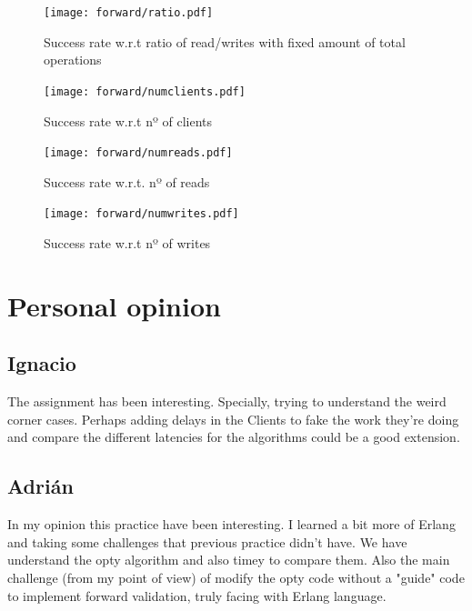 \documentclass[a4paper, 10pt]{article}
\begin{document}
\begin{figure}[H]
  \centering
  \texttt{[image: forward/ratio.pdf]}
    \caption{Success rate w.r.t ratio of read/writes with fixed amount of total operations}
    \label{}
\end{figure} 

\begin{figure}[H]
  \centering
  \texttt{[image: forward/numclients.pdf]}
    \caption{Success rate w.r.t nº of clients}
    \label{}
\end{figure} 

\begin{figure}[H]
  \centering
  \texttt{[image: forward/numreads.pdf]}
    \caption{Success rate w.r.t. nº of reads}
    \label{}
\end{figure} 

\begin{figure}[H]
  \centering
  \texttt{[image: forward/numwrites.pdf]}
    \caption{Success rate w.r.t nº of writes}
    \label{}
\end{figure} 



\clearpage
\section{Personal opinion}

\subsection{Ignacio}

The assignment has been interesting. Specially, trying to understand the weird corner cases. Perhaps adding delays in the Clients to fake the work they're doing and compare the different latencies for the algorithms could be a good extension.

\subsection{Adrián}

In my opinion this practice have been interesting. I learned a bit more of Erlang and taking some challenges that previous practice didn't have. We have understand the opty algorithm and also timey to compare them. Also the main challenge (from my point of view) of modify the opty code without a "guide" code to implement forward validation, truly facing with Erlang language.
\end{document}
